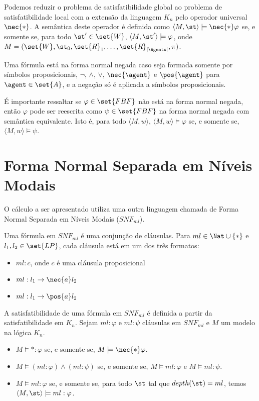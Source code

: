 Podemos reduzir o problema de satisfatibilidade global ao problema de satisfatibilidade local com a extensão da linguagem $K_n$ pelo operador universal $\nec{*}$. A semântica deste operador é definida como $\langle M,\st \rangle \models \nec{*}\varphi$ se, e somente se, para todo $\st' \in \set{W}$, $\langle M,\st' \rangle \models \varphi$, onde $M = (\set{W}, \st_0, \set{R}_1, \ldots, \set{R}_{|\Agents|}, \pi)$.

\begin{definition}
	Uma fórmula está na forma normal negada caso seja formada somente por símbolos proposicionais, $\neg$, $\land$, $\lor$, $\nec{\agent}$ e $\pos{\agent}$ para $\agent \in \set{A}$, e a negação só é aplicada a símbolos proposicionais.
\end{definition}

É importante ressaltar se $\varphi \in \set{FBF}$ não está na forma normal negada, então $\varphi$ pode ser reescrita como $\psi \in \set{FBF}$ na forma normal negada com semântica equivalente. Isto é, para todo $\langle M, w \rangle$, $\langle M, w \rangle \models \varphi$ se, e somente se, $\langle M, w \rangle \models \psi$.

\section{Forma Normal Separada em Níveis Modais}
O cálculo a ser apresentado utiliza uma outra linguagem chamada de Forma Normal Separada em Níveis Modais ($SNF_{ml}$).

\begin{definition}
	Uma fórmula em $SNF_{ml}$ é uma conjunção de cláusulas. Para $ml \in \Nat \cup \{*\}$ e $l_1, l_2 \in \set{LP}$, cada cláusula está em um dos três formatos:
	\begin{itemize}
		\item $ml: c$, onde $c$ é uma cláusula proposicional
		\item $ml: l_1 \rightarrow \nec{a}l_2$
		\item $ml: l_1 \rightarrow \pos{a}l_2$
	\end{itemize}
\end{definition}

A satisfatibilidade de uma fórmula em $SNF_{ml}$ é definida a partir da satisfatibilidade em $K_n$. Sejam $ml: \varphi$ e $ml: \psi$ cláusulas em $SNF_{ml}$ e $M$ um modelo na lógica $K_n$.

\begin{itemize}
	\item $M \models *: \varphi$ se, e somente se, $M \models \nec{*}\varphi$.
	\item $M \models (ml: \varphi) \land (ml: \psi)$ se, e somente se, $M \models ml: \varphi$ e $M \models ml: \psi$.
	\item $M \models ml: \varphi$ se, e somente se, para todo $\st$ tal que $depth(\st) = ml$, temos $\langle M, \st \rangle \models ml: \varphi$.
\end{itemize}

